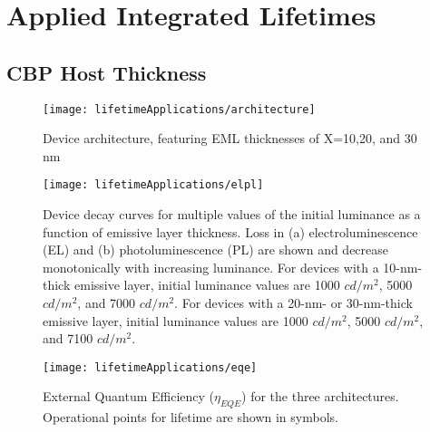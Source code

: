 \documentclass[../thesis.tex]{subfiles}
\begin{document}
\chapter{Applied Integrated Lifetimes}

\section{CBP Host Thickness}

\begin{figure}[ht]
\centering
\texttt{[image: lifetimeApplications/architecture]}
\caption{Device architecture, featuring EML thicknesses of X=10,20, and 30 nm}
\label{fig:architecture}
\end{figure}

\begin{figure}[ht]
\centering
\texttt{[image: lifetimeApplications/elpl]}
\caption{Device decay curves for multiple values of the initial luminance as a function of emissive layer thickness.  Loss in (a) electroluminescence (EL) and (b) photoluminescence (PL) are shown and decrease monotonically with increasing luminance.  For devices with a 10-nm-thick emissive layer, initial luminance values are 1000 $cd/m^2$, 5000 $cd/m^2$, and 7000 $cd/m^2$.  For devices with a 20-nm- or 30-nm-thick emissive layer, initial luminance values are 1000 $cd/m^2$, 5000 $cd/m^2$, and 7100 $cd/m^2$. }
\label{fig:elpl}
\end{figure}

\begin{figure}[ht]
\centering
\texttt{[image: lifetimeApplications/eqe]}
\caption{External Quantum Efficiency ($\eta_{EQE}$) for the three architectures.  Operational points for lifetime are shown in symbols.}
\label{fig:eqe}
\end{figure}
\end{document}

